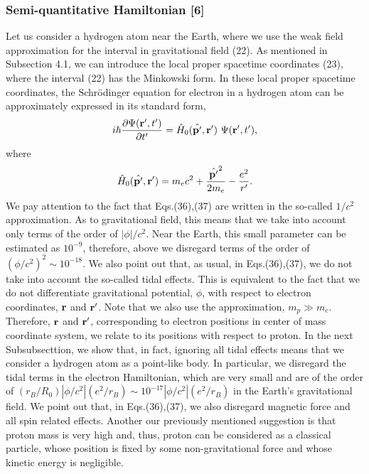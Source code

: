 \documentclass{ws-ijmpd}
\begin{document}
\subsubsection{Semi-quantitative Hamiltonian [6]}
Let us consider a hydrogen atom near the Earth, where we use the
weak field approximation for the interval in gravitational field
(22). As mentioned in Subsection 4.1, we can introduce the local
proper spacetime coordinates (23), where the interval (22) has the
Minkowski form. In these local proper spacetime coordinates, the
Schr\"{o}dinger equation for electron in a hydrogen atom can be
approximately expressed in its standard form,
\begin{equation}
i \hbar \frac{\partial \Psi({\bf r'},t')}{\partial t'} = \hat H_0
(\hat {\bf p'},{\bf r'}) \ \Psi({\bf r'},t')  ,
\end{equation}
where
\begin{equation}
\hat H_0 (\hat {\bf p'},{\bf r'})= m_ec^2 + \frac{\hat {\bf
p'}^2}{2 m_e} - \frac{e^2}{r'} .
\end{equation}
We pay attention to the fact that Eqs.(36),(37) are written in the
so-called $1/c^2$ approximation. As to gravitational field, this
means that we take into account only terms of the order of
$|\phi|/c^2$. Near the Earth, this small parameter can be
estimated as $10^{-9}$, therefore, above we disregard terms of the
order of $(\phi/c^2)^2 \sim 10^{-18}$. We also point out that, as
usual, in Eqs.(36),(37), we do not take into account the so-called
tidal effects. This is equivalent to the fact that we do not
differentiate gravitational potential, $\phi$, with respect to
electron coordinates, ${\bf r}$ and ${\bf r'}$. Note that we also
use the approximation, $m_p \gg m_e$. Therefore, ${\bf r}$ and
${\bf r'}$, corresponding to electron positions in center of mass
coordinate system, we relate to its positions with respect to
proton. In the next Subsubsecttion, we show that, in fact,
ignoring all tidal effects means that we consider a hydrogen
atom as a point-like body. In particular, we disregard the tidal
terms in the electron Hamiltonian, which are very small and are of
the order of $(r_B/R_0)|\phi/c^2|(e^2/r_B) \sim
10^{-17}|\phi/c^2|(e^2/r_B)$ in the Earth's gravitational field.
We point out that, in Eqs.(36),(37), we also disregard magnetic
force and all spin related effects. Another our previously mentioned
suggestion is that proton mass is very high and, thus, proton can
be considered as a classical particle, whose position is fixed by
some non-gravitational force and whose kinetic energy is
negligible.
\end{document}
